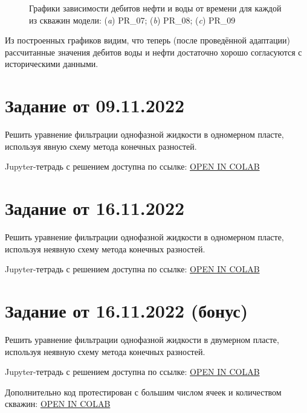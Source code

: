 \documentclass[a4paper,12pt]{article}
\begin{document}
\begin{figure}[H]
\begin{subfigure}[t]{\dimexpr.5\linewidth-1.3em\relax}
\end{subfigure}%
\captionsetup{justification=centering} %
\caption{Графики зависимости дебитов нефти и воды от времени для каждой из скважин модели: ({\itshape a}) PR\_07; ({\itshape b}) PR\_08; ({\itshape c}) PR\_09} 
\label{fig:adapted_wells_2}
\end{figure}

Из построенных графиков видим, что теперь (после проведённой адаптации) рассчитанные значения дебитов воды и нефти достаточно хорошо согласуются с историческими данными.

\newpage



\section{Задание от 09.11.2022}

Решить уравнение фильтрации однофазной жидкости в одномерном пласте, используя явную схему метода конечных разностей.

Jupyter-тетрадь с решением доступна по ссылке: \href{https://colab.research.google.com/github/mualal/notebooks-source/blob/master/10_one_dimensional_filtration.ipynb}{OPEN IN COLAB}

\newpage
\section{Задание от 16.11.2022}

Решить уравнение фильтрации однофазной жидкости в одномерном пласте, используя неявную схему метода конечных разностей.

Jupyter-тетрадь с решением доступна по ссылке: \href{https://colab.research.google.com/github/mualal/notebooks-source/blob/master/10_one_dimensional_filtration.ipynb}{OPEN IN COLAB}

\newpage
\section{Задание от 16.11.2022 (бонус)}

Решить уравнение фильтрации однофазной жидкости в двумерном пласте, используя неявную схему метода конечных разностей.

Jupyter-тетрадь с решением доступна по ссылке: \href{https://colab.research.google.com/github/mualal/notebooks-source/blob/master/12_two_dimensional_filtration.ipynb}{OPEN IN COLAB}

Дополнительно код протестирован с большим числом ячеек и количеством скважин: \href{https://colab.research.google.com/github/mualal/notebooks-source/blob/master/13_two_dimensional_filtration.ipynb}{OPEN IN COLAB}
\end{document}
